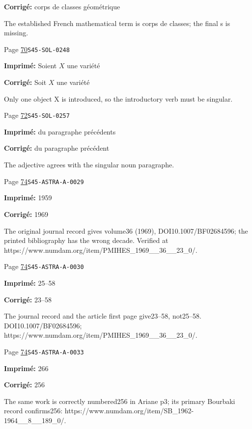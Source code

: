 \begin{description}
\par\noindent\textbf{Corrigé:} corps de classes géométrique
\par\noindent The established French mathematical term is corps de classes; the final s is missing.
\smallskip
\item[\hypertarget{apparatus:FR-0029}{29}] Page \hyperlink{printpage:fr:70}{70}\quad\texttt{S45-SOL-0248}
\par\noindent\textbf{Imprimé:} Soient $X$ une variété
\par\noindent\textbf{Corrigé:} Soit $X$ une variété
\par\noindent Only one object X is introduced, so the introductory verb must be singular.
\smallskip
\item[\hypertarget{apparatus:FR-0030}{30}] Page \hyperlink{printpage:fr:72}{72}\quad\texttt{S45-SOL-0257}
\par\noindent\textbf{Imprimé:} du paragraphe précédents
\par\noindent\textbf{Corrigé:} du paragraphe précédent
\par\noindent The adjective agrees with the singular noun paragraphe.
\smallskip
\item[\hypertarget{apparatus:FR-0031}{31}] Page \hyperlink{printpage:fr:74}{74}\quad\texttt{S45-ASTRA-A-0029}
\par\noindent\textbf{Imprimé:} 1959
\par\noindent\textbf{Corrigé:} 1969
\par\noindent The original journal record gives volume36 (1969), DOI10.1007/BF02684596; the printed bibliography has the wrong decade. Verified at https://www.numdam.org/item/PMIHES\_1969\_\_36\_\_23\_0/.
\smallskip
\item[\hypertarget{apparatus:FR-0032}{32}] Page \hyperlink{printpage:fr:74}{74}\quad\texttt{S45-ASTRA-A-0030}
\par\noindent\textbf{Imprimé:} 25--58
\par\noindent\textbf{Corrigé:} 23--58
\par\noindent The journal record and the article first page give23–58, not25–58. DOI10.1007/BF02684596; https://www.numdam.org/item/PMIHES\_1969\_\_36\_\_23\_0/.
\smallskip
\item[\hypertarget{apparatus:FR-0033}{33}] Page \hyperlink{printpage:fr:74}{74}\quad\texttt{S45-ASTRA-A-0033}
\par\noindent\textbf{Imprimé:} 266
\par\noindent\textbf{Corrigé:} 256
\par\noindent The same work is correctly numbered256 in Ariane p3; its primary Bourbaki record confirms256: https://www.numdam.org/item/SB\_1962-1964\_\_8\_\_189\_0/.

\end{description}
